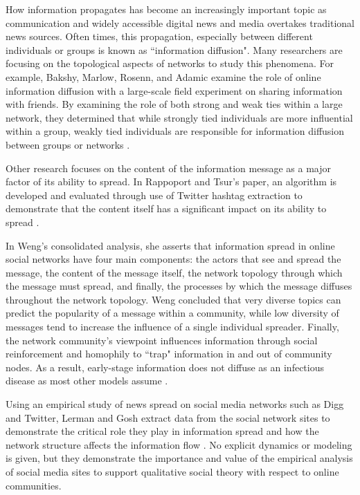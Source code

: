 How information propagates has become an increasingly important topic as communication and widely accessible digital news and media overtakes traditional news sources. Often times, this propagation, especially between different individuals or groups is known as ``information diffusion". Many researchers are focusing on the topological aspects of networks to study this phenomena. For example, Bakshy, Marlow, Rosenn, and Adamic examine the role of online information diffusion with a large-scale field experiment on sharing information with friends. By examining the role of both strong and weak ties within a large network, they determined that while strongly tied individuals are more influential within a group, weakly tied individuals are responsible for information diffusion between groups or networks \cite{bakshy2012role}. 

Other research focuses on the content of the information message as a major factor of its ability to spread. In Rappoport and Tsur's paper, an algorithm is developed and evaluated through use of Twitter hashtag extraction to demonstrate that the content itself has a significant impact on its ability to spread \cite{tsur2012s}.

In Weng's consolidated analysis, she asserts that information spread in online social networks have four main components: the actors that see and spread the message, the content of the message itself, the network topology through which the message must spread, and finally, the processes by which the message diffuses throughout the network topology. Weng concluded that very diverse topics can predict the popularity of a message within a community, while low diversity of messages tend to increase the influence of a single individual spreader. Finally, the network community's viewpoint influences information through social reinforcement and homophily to ``trap" information in and out of community nodes. As a result, early-stage information does not diffuse as an infectious disease as most other models assume \cite{weng2014information}.

Using an empirical study of news spread on social media networks such as Digg and Twitter, Lerman and Gosh extract data from the social network sites to demonstrate the critical role they play in information spread and how the network structure affects the information flow \cite{lerman2010information}. No explicit dynamics or modeling is given, but they demonstrate the importance and value of the empirical analysis of social media sites to support qualitative social theory with respect to online communities. 

